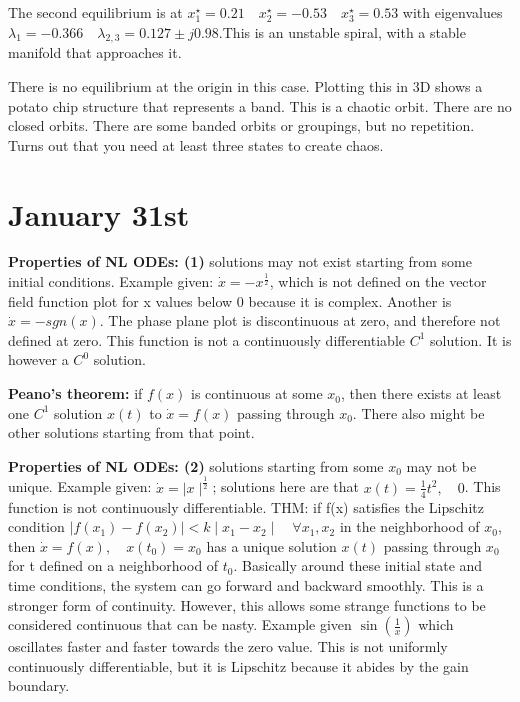 \documentclass[11pt]{article}
\begin{document}
The second equilibrium is at $x_1^\star = 0.21 \quad x_2^\star = -0.53 \quad x_3^\star=0.53$ with eigenvalues $\lambda_1 = -0.366 \quad \lambda_{2,3}=0.127\pm j0.98$.This is an unstable spiral, with a stable manifold that approaches it.

There is no equilibrium at the origin in this case. Plotting this in 3D shows a potato chip structure that represents a band. This is a chaotic orbit. There are no closed orbits. There are some banded orbits or groupings, but no repetition. Turns out that you need at least three states to create chaos.





\section*{January 31st} %
\label{sec:jan31}
\textbf{Properties of NL ODEs: (1)} solutions may not exist starting from some initial conditions. Example given: $\dot{x}=-x^{\frac{1}{2}}$, which is not defined on the vector field function plot for x values below 0 because it is complex. Another is $\dot{x} = -sgn(x)$. The phase plane plot is discontinuous at zero, and therefore not defined at zero. This function is not a continuously differentiable $C^1$ solution. It is however a $C^0$ solution. 

\textbf{Peano's theorem:} if $f(x)$ is continuous at some $x_0$, then there exists at least one $C^1$ solution $x(t)$ to $\dot{x}=f(x)$ passing through $x_0$. There also might be other solutions starting from that point.

\textbf{Properties of NL ODEs: (2)} solutions starting from some $x_0$ may not be unique. Example given: $\dot{x} = \mid x \mid^{\frac{1}{2}}$; solutions here are that $x(t) = \frac{1}{4}t^2,\quad 0$. This function is not continuously differentiable.  THM: if f(x) satisfies the Lipschitz condition $\mid f(x_1) - f(x_2)\mid < k\mid x_1 - x_2 \mid \quad \forall x_1,x_2$
in the neighborhood of $x_0$, then $\dot{x} = f(x), \quad x(t_0) = x_0$ has a unique solution $x(t)$ passing through $x_0$ for t defined on a neighborhood of $t_0$. Basically around these initial state and time conditions, the system can go forward and backward smoothly. This is a stronger form of continuity. However, this allows some strange functions to be considered continuous that can be nasty. Example given $\sin(\frac{1}{x})$ which oscillates faster and faster towards the zero value. This is not uniformly continuously differentiable, but it is Lipschitz because it abides by the gain boundary.
\end{document}
